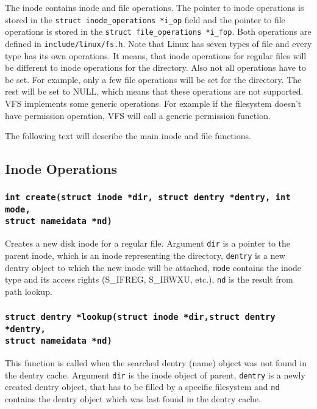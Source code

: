 The inode contains inode and file operations. The pointer to inode operations is stored in
the \texttt{struct inode\_operations *i\_op} field and the pointer to file operations
is stored in the \texttt{struct file\_operations *i\_fop}. Both operations are defined
in \texttt{include/linux/fs.h}. Note that Linux has seven types of file and every type
has its own operations. It means, that inode operations for regular files will be
different to inode operations for the directory. Also not all operations have to be set.
For example, only a few file operations will be set for the directory. The rest will be set
to NULL, which means that these operations are not supported. VFS implements some
generic operations. For example if the filesystem doesn't have permission operation, VFS
will call a generic permission function.

The following text will describe the main inode and file functions.


\subsection{Inode Operations}
\subsubsection{\texttt{int create(struct inode *dir, struct dentry *dentry, int mode,
\\ struct nameidata *nd)}}

Creates a new disk inode for a regular file. Argument \texttt{dir} is a pointer to the
parent inode, which is an inode representing the directory, \texttt{dentry} is a new dentry
object to which the new inode will be attached, \texttt{mode} contains the inode type
and its access rights (S\_IFREG, S\_IRWXU, etc.), \texttt{nd} is the result from path lookup.

\subsubsection{\texttt{struct dentry *lookup(struct inode *dir,struct dentry
*dentry,\\ struct nameidata *nd)}}

This function is called when the searched dentry (name) object was not found in the dentry
cache. Argument \texttt{dir} is the inode object of parent, \texttt{dentry} is a newly created
dentry object, that has to be filled by a specific filesystem and \texttt{nd} contains
the dentry object which was last found in the dentry cache.

